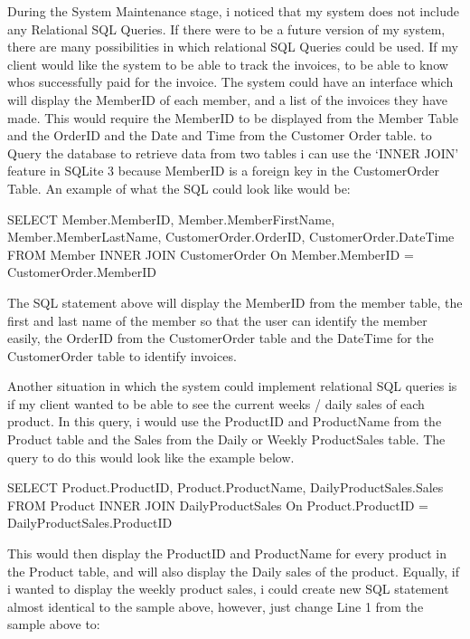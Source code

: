 \pagebreak


\label{fig:improvements-sql}
During the System Maintenance stage, i noticed that my system does not include any Relational SQL Queries. If there were to be a future version of my system, there are many possibilities in which relational SQL Queries could be used. If my client would like the system to be able to track the invoices, to be able to know whos successfully paid for the invoice. The system could have an interface which will display the MemberID of each member, and a list of the invoices they have made. This would require the MemberID to be displayed from the Member Table and the OrderID and the Date and Time from the Customer Order table. to Query the database to retrieve data from two tables i can use the `INNER JOIN' feature in SQLite 3 because MemberID is a foreign key in the CustomerOrder Table. An example of what the SQL could look like would be:
\begin{sql}
SELECT Member.MemberID, Member.MemberFirstName, Member.MemberLastName, CustomerOrder.OrderID, CustomerOrder.DateTime
FROM Member
INNER JOIN CustomerOrder
On Member.MemberID = CustomerOrder.MemberID
\end{sql}

The SQL statement above will display the MemberID from the member table, the first and last name of the member so that the user can identify the member easily, the OrderID from the CustomerOrder table and the DateTime for the CustomerOrder table to identify invoices.

Another situation in which the system could implement relational SQL queries is if my client wanted to be able to see the current weeks / daily sales of each product. In this query, i would use the ProductID and ProductName from the Product table and the Sales from the Daily or Weekly ProductSales table. The query to do this would look like the example below.
\begin{sql}
SELECT Product.ProductID, Product.ProductName, DailyProductSales.Sales
FROM Product
INNER JOIN DailyProductSales
On Product.ProductID = DailyProductSales.ProductID
\end{sql}

This would then display the ProductID and ProductName for every product in the Product table, and will also display the Daily sales of the product. Equally, if i wanted to display the weekly product sales, i could create new SQL statement almost identical to the sample above, however, just change Line 1 from the sample above to:


